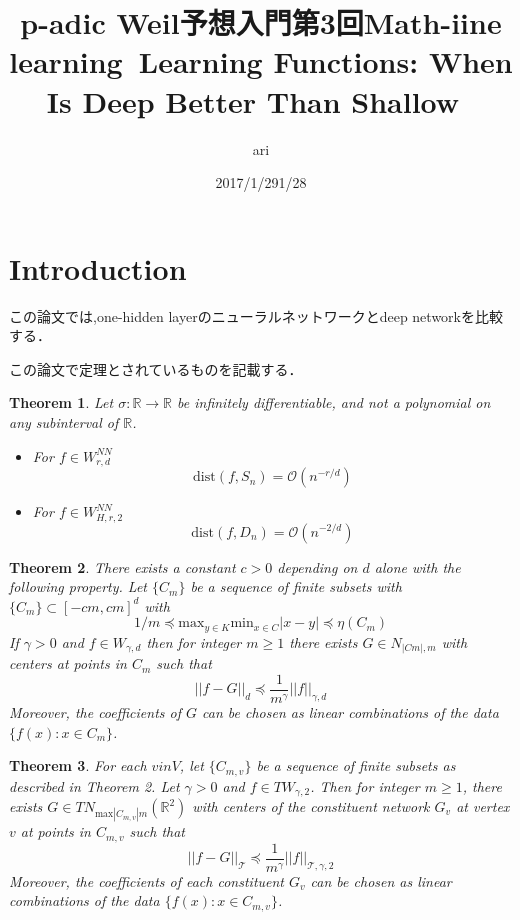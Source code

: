 \documentclass{ujarticle}
\author{ari}
\title{p-adic Weil予想入門}
\date{2017/1/29}
\title{第3回Math-iine learning~Learning Functions: When Is Deep Better Than Shallow~}
\author{}
\date{1/28}
\newtheorem{thm}{Theorem}[section]
\begin{document}
\maketitle
\tableofcontents

\section{Introduction}
\label{sec:Introduction}
この論文では,one-hidden layerのニューラルネットワークとdeep networkを比較する．

この論文で定理とされているものを記載する．
\begin{thm}
  Let $\sigma:\mathbb{R} \to \mathbb{R}$ be infinitely differentiable, and not a polynomial
  on any subinterval of $\mathbb{R}$.
  \begin{itemize}
    \item For $f \in W_{r,d}^{NN}$
    \begin{equation*}
     \mathrm{dist}(f,S_n) = \mathcal{O}(n^{-r/d})
    \end{equation*}
    \item For $f \in W_{H,r,2}^{NN}$
    \begin{equation*}
     \mathrm{dist}(f,D_n)= \mathcal{O}(n^{-2/d})
    \end{equation*}
  \end{itemize}
\end{thm}

\begin{thm}
There exists a constant $c > 0$ depending on $d$ alone with the following property.
Let  $\{ C_m \}$ be a sequence of finite subsets with $\{ C_m \} \subset [-cm,cm]^d$ with
\begin{equation*}
  1/m \preceq \mathrm{max}_{y \in K}\mathrm{min}_{x \in C}|x -y | \preceq  \eta(C_m)
\end{equation*}
 If $\gamma > 0$ and $f \in W_{\gamma,d}$
 then for integer $m \ge 1$ there exists
 $G \in N_{|Cm|,m}$ with centers at points in $C_m$
 such that
\begin{equation*}
  ||f -G||_d \preceq \frac{1}{m^{\gamma}}||f||_{\gamma,d}
\end{equation*}
 Moreover, the coefficients of $G$ can be chosen as linear combinations of the data $\{f(x) : x \in C_m\}$.
\end{thm}

\begin{thm}
  For each $v in V$, let  $\{C_{m,v}\}$ be a sequence of finite subsets as described in Theorem 2.
  Let $\gamma > 0$ and $f \in TW_{\gamma,2}$.
  Then for integer $m \ge 1$, there exists $G \in TN_{\mathrm{max} |C_{m,v}|m}(\mathbb{R}^2)$
  with centers of the constituent network $G_v$ at vertex $v$ at points in $C_{m,v}$ such that
\begin{equation*}
  ||f - G||_{\mathcal{T}} \preceq \frac{1}{m^{\gamma}}||f||_{\mathcal{T},\gamma,2}
\end{equation*}
Moreover, the coefficients of each constituent $G_v$
can be chosen as linear combinations of the data $\{f(x) : x \in C_{m,v} \}$.
\end{thm}
\end{document}
